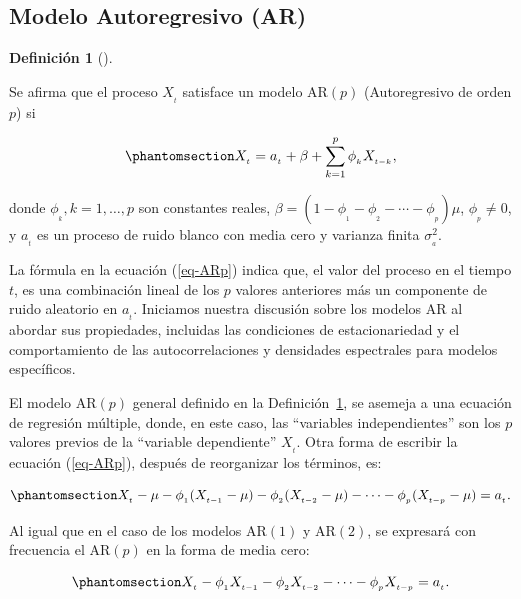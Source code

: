 \documentclass[
  us-letterpaper,
]{scrreprt}
\theoremstyle{plain}
\theoremstyle{definition}
\newtheorem{definition}{Definición}[chapter]
\theoremstyle{definition}
\theoremstyle{plain}
\theoremstyle{remark}
\begin{document}
\subsection{Modelo Autoregresivo (AR)}\label{modelo-autoregresivo-ar}

\begin{definition}[]\protect\hypertarget{def-mARp}{}\label{def-mARp}

Se afirma que el proceso \(X_{_t}\) satisface un modelo
\(\mathrm{AR}(p)\) (Autoregresivo de orden \(p\)) si

\begin{equation}\phantomsection\label{eq-ARp}{
X_{_t}=a_{_t}+\beta+\sum_{k=1}^p \phi_{_k}X_{_{t-k}},
}\end{equation}

donde \(\phi_{_k}, k=1,\ldots,p\) son constantes reales,
\(\beta = \left(1-\phi_{_1}-\phi_{_2}-\cdots-\phi_{_p}\right)\mu\),
\(\phi_{_p}\neq 0\), y \(a_{_t}\) es un proceso de ruido blanco con
media cero y varianza finita \(\sigma_{_a}^2\).

\end{definition}

La fórmula en la ecuación (\ref{eq-ARp}) indica que, el valor del
proceso en el tiempo \(t\), es una combinación lineal de los \(p\)
valores anteriores más un componente de ruido aleatorio en \(a_{_t}\).
Iniciamos nuestra discusión sobre los modelos \(\mathrm{AR}\) al abordar
sus propiedades, incluidas las condiciones de estacionariedad y el
comportamiento de las autocorrelaciones y densidades espectrales para
modelos específicos.

El modelo \(\mathrm{AR}(p)\) general definido en la
Definición~\ref{def-mARp}, se asemeja a una ecuación de regresión
múltiple, donde, en este caso, las ``variables independientes'' son los
\(p\) valores previos de la ``variable dependiente'' \(X_{_t}\). Otra
forma de escribir la ecuación (\ref{eq-ARp}), después de reorganizar los
términos, es:

\begin{equation}\phantomsection\label{eq-oarp}{
X_{_t}-\mu-\phi_{_1}(X_{_{t-1}}-\mu)-\phi_{_2}(X_{_{t-2}}-\mu)-\cdots-\phi_{_p}(X_{_{t-p}}-\mu)=a_{_t}.
}\end{equation}

Al igual que en el caso de los modelos \(\mathrm{AR}(1)\) y
\(\mathrm{AR}(2)\), se expresará con frecuencia el \(\mathrm{AR}(p)\) en
la forma de media cero:

\begin{equation}\phantomsection\label{eq-m0arp}{
X_{_t} -\phi_{_1}X_{_{t-1}}-\phi_{_2}X_{_{t-2}}-\cdots-\phi_{_p}X_{_{t-p}}=a_{_t}.
}\end{equation}
\end{document}
